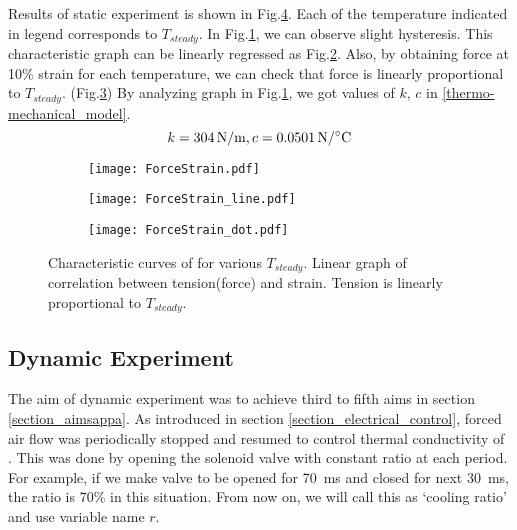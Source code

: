 Results of static experiment is shown in Fig.\ref{static1_results}. Each of the temperature indicated in legend corresponds to $T_{steady}$. In Fig.\ref{static1_result}, we can observe slight hysteresis. This characteristic graph can be linearly regressed as Fig.\ref{static1_line}. Also, by obtaining force at 10\% strain for each temperature, we can check that force is linearly proportional to $T_{steady}$. (Fig.\ref{static1_dot}) By analyzing graph in Fig.\ref{static1_result}, we got values of $k$, $c$ in \eqref{thermo-mechanical_model}.
\begin{equation}
k=\SI{304}{\newton\per\meter}, c=\SI{0.0501}{\newton\per\degreeCelsius} \notag
\end{equation}

\begin{figure}[t]
	\centering
	\begin{subfigure}[t]{0.3\textwidth}
		\texttt{[image: ForceStrain.pdf]}
		\caption{\label{static1_result}}
	\end{subfigure}%
	\begin{subfigure}[t]{0.3\textwidth}
		\texttt{[image: ForceStrain\_line.pdf]}
		\caption{\label{static1_line}}
	\end{subfigure}%
	\begin{subfigure}[t]{0.3\textwidth}
		\texttt{[image: ForceStrain\_dot.pdf]}
		\caption{\label{static1_dot}}
	\end{subfigure}
	\caption[Results of static experiment]{ Characteristic curves of \scp for various $T_{steady}$.  Linear graph of correlation between tension(force) and strain.  Tension is linearly proportional to $T_{steady}$.}
	\label{static1_results}
\end{figure}

\subsection{Dynamic Experiment}\label{section_dynamic} %
The aim of dynamic experiment was to achieve third to fifth aims in section \ref{section_aimsappa}.
As introduced in section \ref{section_electrical_control}, forced air flow was periodically stopped and resumed to control thermal conductivity of \scpnospace.
This was done by opening the solenoid valve with constant ratio at each period. For example, if we make valve to be opened for \SI{70}{\milli\second} and closed for next \SI{30}{\milli\second}, the ratio is 70\% in this situation. From now on, we will call this as `cooling ratio' and use variable name $r$.
 
